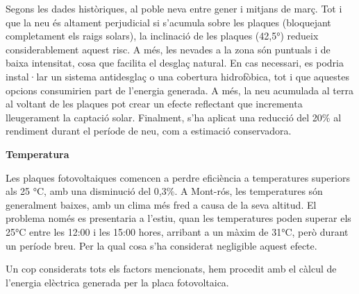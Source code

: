 \documentclass[10pt, twoside, a4paper]{article}
\begin{document}
Segons les dades històriques, al poble neva entre gener i mitjans de març. Tot i que la neu és altament perjudicial si s'acumula sobre les plaques (bloquejant completament els raigs solars), la inclinació de les plaques (42,5°) redueix considerablement aquest risc. A més, les nevades a la zona són puntuals i de baixa intensitat, cosa que facilita el desglaç natural.
En cas necessari, es podria instal·lar un sistema antidesglaç o una cobertura hidrofòbica, tot i que aquestes opcions consumirien part de l'energia generada. A més, la neu acumulada al terra al voltant de les plaques pot crear un efecte reflectant que incrementa lleugerament la captació solar. Finalment, s'ha aplicat una reducció del 20\% al rendiment durant el període de neu, com a estimació conservadora.

\textbf{Temperatura}

Les plaques fotovoltaiques comencen a perdre eficiència a temperatures superiors als 25 °C, amb una disminució del 0,3\%. A Mont-rós, les temperatures són generalment baixes, amb un clima més fred a causa de la seva altitud. El problema només es presentaria a l'estiu, quan les temperatures poden superar els 25°C entre les 12:00 i les 15:00 hores, arribant a un màxim de 31°C, però durant un període breu. Per la qual cosa s'ha considerat negligible aquest efecte.

Un cop considerats tots els factors mencionats, hem procedit amb el càlcul de l'energia elèctrica generada per la placa fotovoltaica. 
\end{document}
